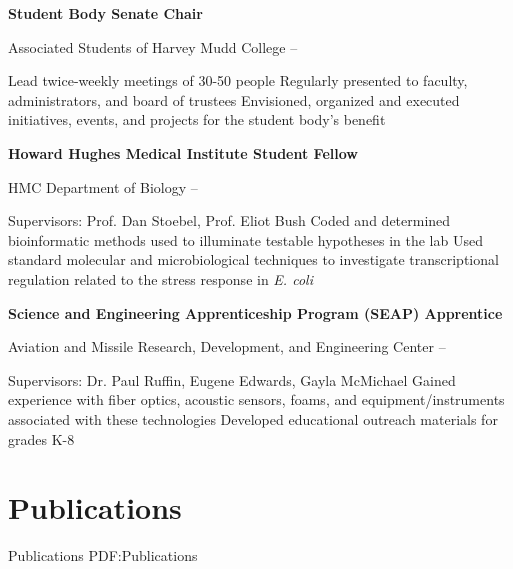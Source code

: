 \documentclass[letterpaper,10pt,oneside]{article}
\begin{document}
\begin{body}
\BigGap

{\textbf{Student Body Senate Chair}}

\GapNoBreak
\BulletItem
Associated Students of Harvey Mudd College 
\hfill
{} --
\begin{detail}
\SubBulletItemBullet
Lead twice-weekly meetings of 30-50 people
\SubBulletItemBullet
Regularly presented to faculty, administrators, and board of trustees
\SubBulletItemBullet
Envisioned, organized and executed initiatives, events, and projects for the student body's benefit
\end{detail}

\BigGap

{\textbf{Howard Hughes Medical Institute Student Fellow}}

\GapNoBreak
\BulletItem
HMC Department of Biology
\hfill
{} --
\begin{detail}
\SubBulletItem
Supervisors:
Prof. Dan Stoebel, Prof. Eliot Bush
\SubBulletItemBullet
Coded and determined bioinformatic methods used to illuminate testable hypotheses in the  lab
\SubBulletItemBullet
Used standard molecular and microbiological techniques to investigate transcriptional regulation related to the stress response in {\it E. coli}
\end{detail}

\BigGap

{\textbf{Science and Engineering Apprenticeship Program (SEAP) Apprentice}}

\GapNoBreak
\BulletItem
Aviation and Missile Research, Development, and Engineering Center \hfill
{} --
\begin{detail}
\SubBulletItem
Supervisors:
Dr. Paul Ruffin, Eugene Edwards, Gayla McMichael
\SubBulletItemBullet
Gained experience with fiber optics, acoustic sensors, foams, and equipment/instruments associated with these technologies
\SubBulletItemBullet
Developed educational outreach materials for grades K-8
\end{detail}


\section
{Publications}
{Publications}
{PDF:Publications}


\end{body}
\end{document}
